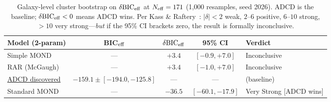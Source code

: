 \begin{table}[t]
\centering\footnotesize
\caption{Galaxy-level cluster bootstrap on $\delta{\rm BIC}_{\rm eff}$ at
$N_{\rm eff}=171$ (1{,}000 resamples, seed 2026).
ADCD is the baseline; $\delta{\rm BIC}_{\rm eff}<0$ means ADCD wins.
Per Kass \& Raftery~\cite{kass1995bayes}: $|\delta|<2$ weak,
$2$--$6$ positive, $6$--$10$ strong, $>10$ very strong---\emph{but} if the
95\% CI brackets zero, the result is formally inconclusive.}
\label{tab:sparc_bic_bootstrap}
\begin{tabularx}{\textwidth}{l c c c L}
\toprule
\textbf{Model (2-param)} & \textbf{BIC}$_{\rm eff}$ &
$\delta{\rm BIC}_{\rm eff}$ & \textbf{95\% CI} & \textbf{Verdict} \\
\midrule
  Simple MOND & --- & $+3.4$ & $[-0.9, +7.0]$ & Inconclusive \\
  RAR (McGaugh) & --- & $+3.4$ & $[-1.0, +7.0]$ & Inconclusive \\
  \underline{ADCD discovered} & $-159.1 \pm [-194.0, -125.8]$ & --- & --- & (baseline) \\
  Standard MOND & --- & $-36.5$ & $[-60.1, -17.9]$ & Very Strong [ADCD wins] \\
\bottomrule
\end{tabularx}
\end{table}
